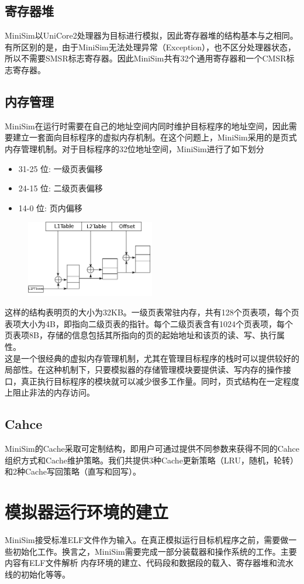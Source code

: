 \documentclass[12pt,a4paper,Flow]{report}
\begin{document}
\section{寄存器堆}
MiniSim以UniCore2处理器为目标进行模拟，因此寄存器堆的结构基本与之相同。有所区别的是，由于MiniSim无法处理异常（Exception），也不区分处理器状态，所以不需要SMSR标志寄存器。因此MiniSim共有32个通用寄存器和一个CMSR标志寄存器。
\section{内存管理}
MiniSim在运行时需要在自己的地址空间内同时维护目标程序的地址空间，因此需要建立一套面向目标程序的虚拟内存机制。在这个问题上，MiniSim采用的是页式内存管理机制。对于目标程序的32位地址空间，MiniSim进行了如下划分
\begin{itemize}
\item 31-25 位: 一级页表偏移
\item 24-15 位: 二级页表偏移
\item 14-0 位: 页内偏移
\end{itemize}
\begin{figure}[H]
  \centering
  \includegraphics[width=0.5\textwidth]{pt.png}
\end{figure}
这样的结构表明页的大小为32KB。一级页表常驻内存，共有128个页表项，每个页表项大小为4B，即指向二级页表的指针。每个二级页表含有1024个页表项，每个页表项8B，存储的信息包括其所指向的页的起始地址和该页的读、写、执行属性。\\
\indent 这是一个很经典的虚拟内存管理机制，尤其在管理目标程序的栈时可以提供较好的局部性。在这种机制下，只要模拟器的存储管理模块要提供读、写内存的操作接口，真正执行目标程序的模块就可以减少很多工作量。同时，页式结构在一定程度上阻止非法的内存访问。
\section{Cahce}
MiniSim的Cache采取可定制结构，即用户可通过提供不同参数来获得不同的Cahce组织方式和Cache维护策略。我们共提供3种Cache更新策略（LRU，随机，轮转）和2种Cache写回策略（直写和回写）。
\chapter{模拟器运行环境的建立}
MiniSim接受标准ELF文件作为输入。在真正模拟运行目标机程序之前，需要做一些初始化工作。换言之，MiniSim需要完成一部分装载器和操作系统的工作。主要内容有ELF文件解析
内存环境的建立、代码段和数据段的载入、寄存器堆和流水线的初始化等等。
\end{document}
